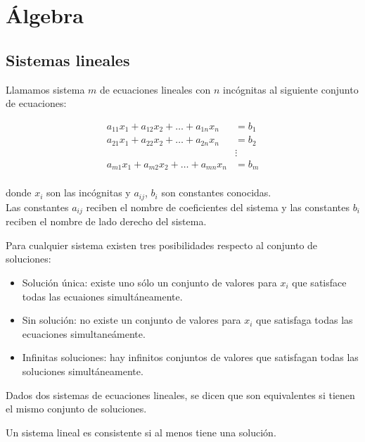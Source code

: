 \chapter{Álgebra}

\section{Sistemas lineales}

\begin{defi}
Llamamos sistema $m$ de ecuaciones lineales con $n$ incógnitas al siguiente conjunto de ecuaciones:

\begin{align*}
a_{11}x_1 + a_{12}x_2 + \dots + a_{1n}x_n & = b_1\\
a_{21}x_1 + a_{22}x_2 + \dots + a_{2n}x_n & = b_2\\
 &\vdots\\
a_{m1}x_1 + a_{m2}x_2 + \dots + a_{mn}x_n & = b_m\\
\end{align*} 

donde $x_i$ son las incógnitas y $a_{ij}$, $b_i$ son constantes conocidas.\\

Las constantes $a_{ij}$ reciben el nombre de coeficientes del sistema y las constantes $b_i$ reciben el nombre de lado derecho del sistema.
\end{defi}

Para cualquier sistema existen tres posibilidades respecto al conjunto de soluciones:

\begin{itemize}
\item Solución única: existe uno  sólo un conjunto de valores para $x_i$ que satisface todas las ecuaiones simultáneamente.
\item Sin solución: no existe un conjunto de valores para $x_i$ que satisfaga todas las ecuaciones simultaneámente.
\item Infinitas soluciones: hay infinitos conjuntos de valores que satisfagan todas las soluciones simultáneamente.
\end{itemize}

\begin{defi}
Dados dos sistemas de ecuaciones lineales, se dicen que son equivalentes si tienen el mismo conjunto de soluciones.
\end{defi}

\begin{defi}
Un sistema lineal es consistente si al menos tiene una solución.
\end{defi}

